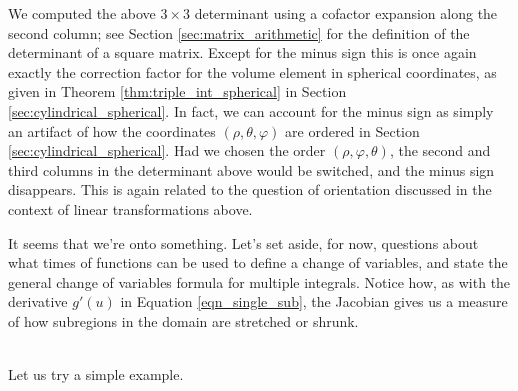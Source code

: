 We computed the above $3\times 3$ determinant using a cofactor expansion along the second column; see Section \ref{sec:matrix_arithmetic} for the definition of the determinant of a square matrix. Except for the minus sign this is once again exactly the correction factor for the volume element in spherical coordinates, as given in Theorem \ref{thm:triple_int_spherical} in Section \ref{sec:cylindrical_spherical}. In fact, we can account for the minus sign as simply an artifact of how the coordinates $(\rho,\theta,\varphi)$ are ordered in Section \ref{sec:cylindrical_spherical}. Had we chosen the order $(\rho,\varphi,\theta)$, the second and third columns in the determinant above would be switched, and the minus sign disappears. This is again related to the question of orientation discussed in the context of linear transformations above.

It seems that we're onto something. Let's set aside, for now, questions about what times of functions can be used to define a change of variables, and state the general change of variables formula for multiple integrals. 
Notice how, as with the derivative $g'(u)$ in Equation \eqref{eqn_single_sub}, the Jacobian gives us a measure of how subregions in the domain are stretched or shrunk.



\\


Let us try a simple example.\\

